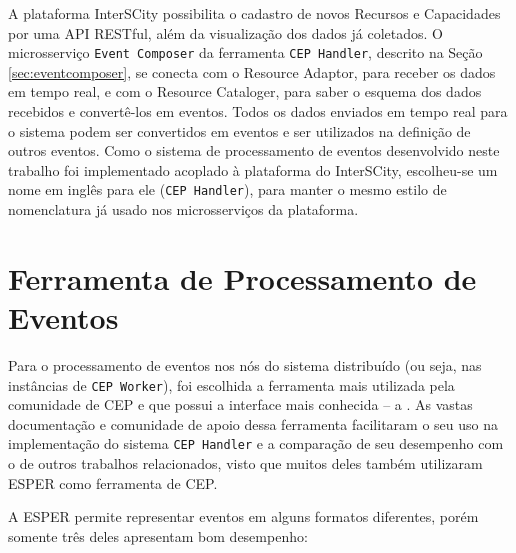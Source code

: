 A plataforma InterSCity possibilita o cadastro de novos Recursos e Capacidades por uma API RESTful, além da visualização dos dados já coletados. O microsserviço \texttt{Event Composer} da ferramenta \texttt{CEP Handler}, descrito na Seção \ref{sec:eventcomposer}, se conecta com o Resource Adaptor, para receber os dados em tempo real, e com o Resource Cataloger, para saber o esquema dos dados recebidos e convertê-los em eventos. Todos os dados enviados em tempo real para o sistema podem ser convertidos em eventos e ser utilizados na definição de outros eventos.
Como o sistema de processamento de eventos desenvolvido neste trabalho foi implementado acoplado à plataforma do InterSCity, escolheu-se um nome em inglês para ele (\texttt{CEP Handler}), para manter o mesmo estilo de nomenclatura já usado nos microsserviços da plataforma.  


\section{Ferramenta de Processamento de Eventos}
Para o processamento de eventos nos nós do sistema distribuído (ou seja, nas instâncias de \texttt{CEP Worker}), foi escolhida a ferramenta mais utilizada pela comunidade de CEP e que possui a interface mais conhecida -- a \cite{ESPER}. As vastas documentação e comunidade de apoio dessa ferramenta facilitaram o seu uso na implementação do sistema \texttt{CEP Handler} e a comparação de seu desempenho com o de outros trabalhos relacionados, visto que muitos deles também utilizaram ESPER como ferramenta de CEP.


A ESPER permite representar eventos em alguns formatos diferentes, porém somente três deles apresentam bom desempenho\citep{EsperEventRepresentation}:

